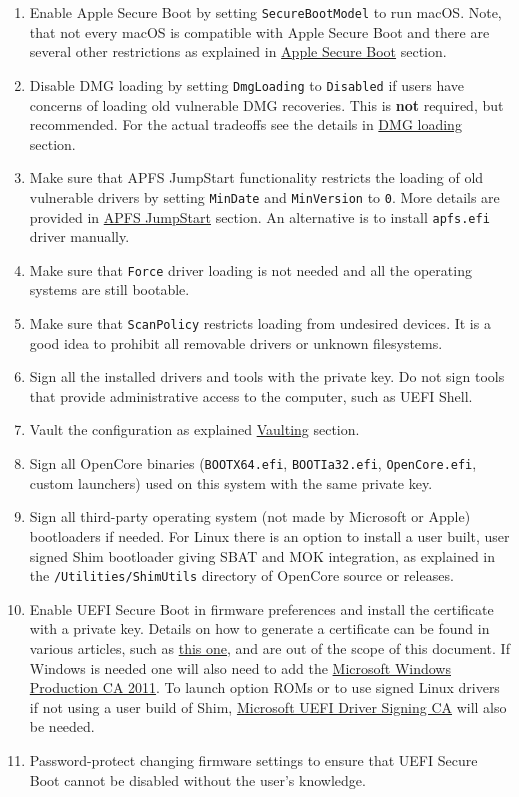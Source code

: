 \documentclass[]{article}
\begin{document}
\begin{enumerate}
\item Enable Apple Secure Boot by setting \texttt{SecureBootModel} to
  run macOS. Note, that not every macOS is compatible with Apple Secure Boot and
  there are several other restrictions as explained in
  \hyperref[secureapplesb]{Apple Secure Boot} section.
\item Disable DMG loading by setting \texttt{DmgLoading} to \texttt{Disabled}
  if users have concerns of loading old vulnerable DMG recoveries. This is
  \textbf{not} required, but recommended. For the actual tradeoffs
  see the details in \hyperref[securedmgloading]{DMG loading} section.
\item Make sure that APFS JumpStart functionality restricts the loading
  of old vulnerable drivers by setting \texttt{MinDate} and \texttt{MinVersion}
  to \texttt{0}. More details are provided in \hyperref[uefiapfsprops]{APFS JumpStart}
  section. An alternative is to install \texttt{apfs.efi} driver manually.
\item Make sure that \texttt{Force} driver loading is not needed and
  all the operating systems are still bootable.
\item Make sure that \texttt{ScanPolicy} restricts loading from undesired
  devices. It is a good idea to prohibit all removable drivers or unknown
  filesystems.
\item Sign all the installed drivers and tools with the private key. Do not sign
  tools that provide administrative access to the computer, such as UEFI Shell.
\item Vault the configuration as explained \hyperref[securevaulting]{Vaulting}
  section.
\item Sign all OpenCore binaries (\texttt{BOOTX64.efi}, \texttt{BOOTIa32.efi},
  \texttt{OpenCore.efi}, custom launchers) used on this system with
  the same private key.
\item Sign all third-party operating system (not made by Microsoft or Apple)
  bootloaders if needed. For Linux there is an option to install
  a user built, user signed Shim bootloader giving SBAT and MOK integration,
  as explained in the \texttt{/Utilities/ShimUtils} directory of OpenCore
  source or releases.
\item Enable UEFI Secure Boot in firmware preferences and install the
  certificate with a private key. Details on how to generate a certificate
  can be found in various articles, such as \href{https://habr.com/en/post/273497}{this one},
  and are out of the scope of this document. If Windows is needed one
  will also need to add the
  \href{http://go.microsoft.com/fwlink/?LinkID=321192}{Microsoft Windows Production CA 2011}.
  To launch option ROMs or to use signed Linux drivers if not using a user build of Shim,
  \href{http://go.microsoft.com/fwlink/?LinkId=321194}{Microsoft UEFI Driver Signing CA} will also be needed.
\item Password-protect changing firmware settings to ensure that UEFI Secure Boot
  cannot be disabled without the user's knowledge.
\end{enumerate}
\end{document}

